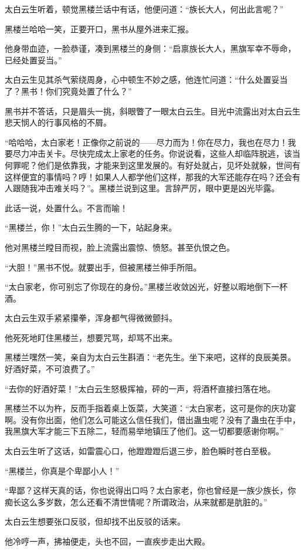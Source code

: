 \begin{this_body}
太白云生听着，顿觉黑楼兰话中有话，他便问道：“族长大人，何出此言呢？”

黑楼兰哈哈一笑，正要开口，黑书从屋外进来汇报。

他身带血迹，一脸恭谨，凑到黑楼兰的身侧：“启禀族长大人，黑旗军幸不辱命，已经处置妥当。”

太白云生见其杀气萦绕周身，心中顿生不妙之感，他连忙问道：“什么处置妥当了？黑书！你们究竟处置了什么？”

黑书并不答话，只是眉头一挑，斜眼瞥了一眼太白云生。目光中流露出对太白云生悲天悯人的行事风格的不屑。

“哈哈哈，太白家老！正像你之前说的——尽力而为！你在尽力，我也在尽力！我要尽力冲击关卡。尽快完成太上家老的任务。你说说看，这些人却临阵脱逃，该当何罪呢？他们是依靠我，才能来到这里发展的。有好处就占，见坏处就躲，世间有这样便宜的事情吗？哼！如果人人都学他们这样，那我的大军还能存在吗？还会有人跟随我冲击难关吗？”。黑楼兰说到这里。言辞严厉，眼中更是凶光毕露。

此话一说，处置什么。不言而喻！

“黑楼兰，你！”太白云生腾的一下，站起身来。

他对黑楼兰瞠目而视，脸上流露出震惊、愤怒。甚至仇恨之色。

“大胆！”黑书不悦。就要出手，但被黑楼兰伸手所阻。

“太白家老，你可别忘了你现在的身份。”黑楼兰收敛凶光，好整以暇地倒下一杯酒。

太白云生双手紧紧攥拳，浑身都气得微微颤抖。

他死死地盯住黑楼兰，想要咒骂，却骂不出来。

黑楼兰嘿然一笑，亲自为太白云生斟酒：“老先生。坐下来吧，这样的良辰美景。好酒好菜，不可浪费了。”

“去你的好酒好菜！”太白云生怒极挥袖，砰的一声，将酒杯直接扫落在地。

黑楼兰不以为杵，反而手指着桌上饭菜，大笑道：“太白家老，这可是你的庆功宴啊。没有你出面，他们怎么可能这么信任我们，借出蛊虫呢？没有了蛊虫在手中，我黑旗大军才能三下五除二，轻而易举地镇压了他们。这一切都要感谢你啊。”

太白云生听了这话，如雷震心口，他蹬蹬蹬后退三步，脸色瞬时苍白至极。

“黑楼兰，你真是个卑鄙小人！”

“卑鄙？这样天真的话，你也说得出口吗？太白家老，你也曾经是一族少族长，你痴长这么多岁数，怎么还看不清世情呢？所谓政治，从来就都是肮脏的。”

太白云生想要张口反驳，但却找不出反驳的话来。

他冷哼一声，拂袖便走，头也不回，一直疾步走出大殿。


\end{this_body}
